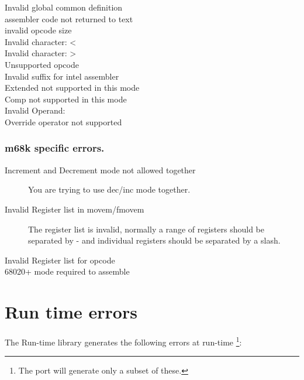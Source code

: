 \documentclass{report}
\begin{document}
\begin{description}
\item [ Invalid global common definition ]
\item [ assembler code not returned to text ]
\item [ invalid opcode size ]
\item [ Invalid character: < ]
\item [ Invalid character: > ]
\item [ Unsupported opcode ]
\item [ Invalid suffix for intel assembler ]
\item [ Extended not supported in this mode ]
\item [ Comp not supported in this mode ]
\item [ Invalid Operand: ]
\item [ Override operator not supported ]
\end{description}

\subsection{m68k specific errors.}
\begin{description}
\item [Increment and Decrement mode not allowed together]
You are trying to use dec/inc mode together.

\item [Invalid Register list in movem/fmovem]
The register list is invalid, normally a range of registers should
be separated by - and individual registers should be separated by
a slash.
\item [Invalid Register list for opcode]
\item [68020+ mode required to assemble]
\end{description}

\chapter{Run time errors}
The \fpc Run-time library generates the following errors at run-time
\footnote{The \linux port will generate only a subset of these.}:
\end{document}
